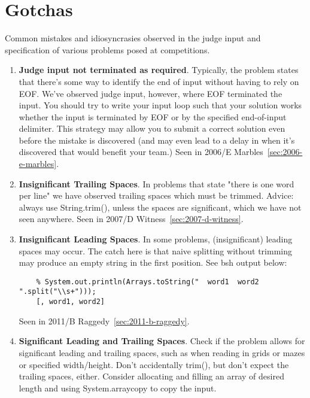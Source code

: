 \chapter{Gotchas}

\label{sec:gotchas}

Common mistakes and idiosyncrasies observed in the judge input and specification of
various problems posed at competitions.

\begin{enumerate}
\item \textbf{Judge input not terminated as required}. Typically, the problem states that
    there's some way to identify the end of input without having to rely on EOF.
    We've observed judge input, however, where EOF terminated the input.
    You should try to write your input loop such that your solution works whether
    the input is terminated by EOF or by the specified end-of-input delimiter.
    This strategy may allow you to submit a correct solution even before the mistake
    is discovered (and may even lead to a delay in when it's discovered that would benefit
    your team.)
    Seen in 2006/E Marbles~\ref{sec:2006-e-marbles}.

\item \textbf{Insignificant Trailing Spaces}.
    In problems that state "there is one word per line" we have observed trailing spaces
    which must be trimmed.   Advice: always use String.trim(), unless the spaces are
    significant, which we have not seen anywhere.
    Seen in 2007/D Witness~\ref{sec:2007-d-witness}.

\item \textbf{Insignificant Leading Spaces}.
    In some problems, (insignificant) leading spaces may occur.  The catch here is that 
    naive splitting without trimming may produce an empty string in the first position.
    See bsh output below:
    \begin{Verbatim}
    % System.out.println(Arrays.toString("  word1  word2  ".split("\\s+")));
    [, word1, word2]
    \end{Verbatim}
 
    Seen in 2011/B Raggedy~\ref{sec:2011-b-raggedy}.

\item \textbf{Significant Leading and Trailing Spaces}.
    Check if the problem allows for significant leading and trailing spaces, such as when
    reading in grids or mazes or specified width/height.  Don't accidentally trim(), but don't
    expect the trailing spaces, either.  Consider allocating and filling an array of desired
    length and using System.arraycopy to copy the input.


\end{enumerate}
